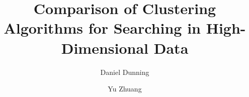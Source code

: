 \documentclass[journal]{IEEEtran}
\begin{document}
%
\title{Comparison of Clustering Algorithms for Searching in High-Dimensional Data}
%
%
%

\author{Daniel Dunning \rule{1in}{0pt} \and Yu Zhuang}
    

% 
%



% 
\end{document}
